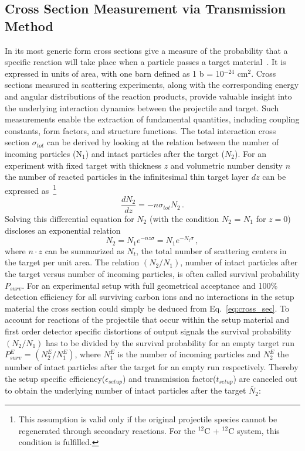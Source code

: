 \subsection{Cross Section Measurement via Transmission Method}\label{section:transmission_method}
In its most generic form cross sections give a measure of the probability that a specific reaction will take place when a particle passes a target material~\cite{bethge2007wiedemann}. It is expressed in units of area, with one barn defined as 1 b = 10$^{-24}$ cm$^2$. Cross sections measured in scattering experiments, along with the corresponding energy and angular distributions of the reaction products, provide valuable insight into the underlying interaction dynamics between the projectile and target. Such measurements enable the extraction of fundamental quantities, including coupling constants, form factors, and structure functions.\newline
The total interaction cross section $\sigma_{tot}$ can be derived by looking at the relation between the number of incoming particles (N$_{1}$) and intact particles after the target ($N_{2}$). For an experiment with fixed target with thickness $z$ and volumetric number density $n$ the number of reacted particles in the infinitesimal thin target layer $dz$ can be expressed as~\footnote{This assumption is valid only if the original projectile species cannot be regenerated through secondary reactions. For the $^{12}$C + $^{12}$C system, this condition is fulfilled.}
\begin{equation}
\frac{dN_{2}}{dz} = -n \sigma_{tot} N_{2} \, .
\end{equation}
Solving this differential equation for $N_{2}$ (with the condition $N_{2}$ = $N_{1}$ for $z=0$) discloses an exponential relation
\begin{equation}
N_{2} = N_{1}e^{-n z \sigma}  = N_{1}e^{-N_t\sigma} \, ,
\label{eq:cross_sec}
\end{equation} 
where $n\cdot z$ can be summarized as $N_t$, the total number of scattering centers in the target per unit area. The relation $(N_{2}/N_{1})$, number of intact particles after the target versus number of incoming particles, is often called survival probability $P_{surv}$. For an experimental setup with full geometrical acceptance and 100\% detection efficiency for all surviving carbon ions and no interactions in the setup material the cross section could simply be deduced from Eq.~\ref{eq:cross_sec}. To account for reactions of the projectile that occur within the setup material and first order detector specific distortions of output signals the survival probability $(N_{2}/N_{1})$ has to be divided by the survival probability for an empty target run $P^{E}_{surv}$ = $(N_{2}^E/N_{1}^E)$, where $N_{1}^E$ is the number of incoming particles and $N_{2}^E$ the number of intact particles after the target for an empty run respectively. Thereby the setup specific efficiency($\epsilon_{setup}$) and transmission factor($t_{setup}$) are canceled out to obtain the underlying number of intact particles after the target $\tilde{N_{2}}$:\newline
